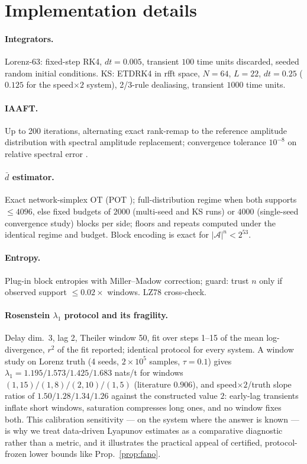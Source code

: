 \documentclass[11pt]{article}
\newcommand{\dbar}{\bar d}
\newcommand{\A}{\mathcal A}
\begin{document}
\section{Implementation details}\label{app:impl}

\paragraph{Integrators.} Lorenz-63: fixed-step RK4, $dt=0.005$, transient $100$ time
units discarded, seeded random initial conditions. KS: ETDRK4 \citep{kassam2005fourth}
in rfft space, $N=64$, $L=22$, $dt=0.25$ ($0.125$ for the speed$\times2$ system),
2/3-rule dealiasing, transient $1000$ time units.

\paragraph{IAAFT.} Up to 200 iterations, alternating exact rank-remap to the reference
amplitude distribution with spectral amplitude replacement; convergence tolerance
$10^{-8}$ on relative spectral error \citep{schreiber1996improved}.

\paragraph{$\dbar$ estimator.} Exact network-simplex OT (POT \citep{flamary2021pot});
full-distribution regime when both supports $\le4096$, else fixed budgets of $2000$
(multi-seed and KS runs) or $4000$ (single-seed convergence study) blocks per side;
floors and repeats computed under the identical regime and budget. Block encoding is
exact for $|\A|^n<2^{53}$.

\paragraph{Entropy.} Plug-in block entropies with Miller--Madow correction; guard:
trust $n$ only if observed support $\le 0.02\times$ windows. LZ78 cross-check.

\paragraph{Rosenstein $\lambda_1$ protocol and its fragility.} Delay dim.\ 3, lag 2,
Theiler window 50, fit over steps 1--15 of the mean log-divergence, $r^2$ of the fit
reported; identical protocol for every system. A window study on Lorenz truth
(4 seeds, $2\times10^5$ samples, $\tau=0.1$) gives $\lambda_1 = 1.195/1.573/1.425/1.683$
nats/t for windows $(1,15)/(1,8)/(2,10)/(1,5)$ (literature $0.906$), and
speed$\times2$/truth slope ratios of $1.50/1.28/1.34/1.26$ against the constructed
value $2$: early-lag transients inflate short windows, saturation compresses long
ones, and no window fixes both. This calibration sensitivity --- on the system where
the answer is known --- is why we treat data-driven Lyapunov estimates as a
comparative diagnostic rather than a metric, and it illustrates the practical appeal
of certified, protocol-frozen lower bounds like Prop.~\ref{prop:fano}.
\end{document}
